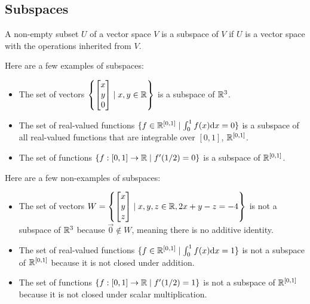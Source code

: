 \subsection{Subspaces}
\begin{definition}
	A non-empty subset $U$ of a vector space $V$ is a subspace of $V$ if $U$ is a vector space with the operations inherited from $V$.
\end{definition}

Here are a few examples of subspaces:
\begin{example}
	\hspace{1pt}
	\begin{itemize}
		\item 
			The set of vectors $\left\{\begin{bmatrix}x \\ y \\ 0\end{bmatrix} \mid x,y \in \mathbb{R}\right\}$ is a subspace of $\mathbb{R}^3$.
		\item
			The set of real-valued functions $\{f \in \mathbb{R}^{[0,1]} \mid \int_{0}^{1}{f(x)\mathrm{d} x} = 0\}$ is a subspace of all real-valued functions that are integrable over $[0,1]$, $\mathbb{R}^{[0,1]}$.
		\item
			The set of functions $\{f: [0,1] \to \mathbb{R} \mid f'(1/2) = 0\}$ is a subspace of $\mathbb{R}^{[0,1]}$.
	\end{itemize}
\end{example}

Here are a few non-examples of subspaces:
\begin{example}
	\hspace{1pt}
	\begin{itemize}
		\item
			The set of vectors $W = \left\{\begin{bmatrix}x\\y\\z\end{bmatrix} \mid x,y,z \in \mathbb{R}, 2x+y-z=-4\right\}$ is not a subspace of $\mathbb{R}^3$ because $\vec{0} \not\in W$, meaning there is no additive identity.
		\item
			The set of real-valued functions $\{f \in \mathbb{R}^{[0,1]} \mid \int_{0}^{1}{f(x)\mathrm{d} x} = 1\}$ is not a subspace of $\mathbb{R}^{[0,1]}$ because it is not closed under addition.
		\item
			The set of functions $\{f: [0,1] \to \mathbb{R} \mid f'(1/2) = 1\}$ is not a subspace of $\mathbb{R}^{[0,1]}$ because it is not closed under scalar multiplication.
	\end{itemize}
	
\end{example}


